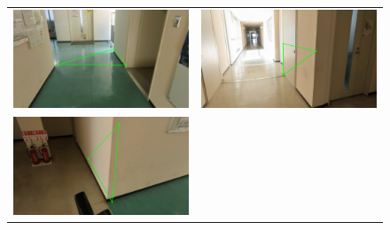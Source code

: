 \documentclass[]{jarticle}          %
\begin{document}
\begin{figure}[H]
  \begin{center}
    \begin{tabular}{cc}
      \includegraphics[keepaspectratio, scale=0.1]{figures/texture1/texture/texture_1_0.png}&
      \includegraphics[keepaspectratio, scale=0.1]{figures/texture1/texture/texture_1_16.png}\\
      \includegraphics[keepaspectratio, scale=0.1]{figures/texture1/texture/texture_1_21.png}&

\end{tabular}
\end{center}
\end{figure}
\end{document}
